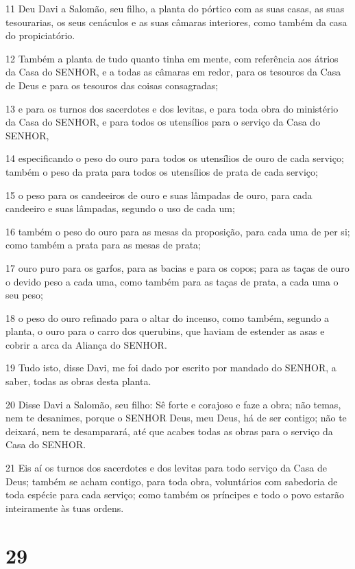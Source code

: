 \par 11 Deu Davi a Salomão, seu filho, a planta do pórtico com as suas casas, as suas tesourarias, os seus cenáculos e as suas câmaras interiores, como também da casa do propiciatório.
\par 12 Também a planta de tudo quanto tinha em mente, com referência aos átrios da Casa do SENHOR, e a todas as câmaras em redor, para os tesouros da Casa de Deus e para os tesouros das coisas consagradas;
\par 13 e para os turnos dos sacerdotes e dos levitas, e para toda obra do ministério da Casa do SENHOR, e para todos os utensílios para o serviço da Casa do SENHOR,
\par 14 especificando o peso do ouro para todos os utensílios de ouro de cada serviço; também o peso da prata para todos os utensílios de prata de cada serviço;
\par 15 o peso para os candeeiros de ouro e suas lâmpadas de ouro, para cada candeeiro e suas lâmpadas, segundo o uso de cada um;
\par 16 também o peso do ouro para as mesas da proposição, para cada uma de per si; como também a prata para as mesas de prata;
\par 17 ouro puro para os garfos, para as bacias e para os copos; para as taças de ouro o devido peso a cada uma, como também para as taças de prata, a cada uma o seu peso;
\par 18 o peso do ouro refinado para o altar do incenso, como também, segundo a planta, o ouro para o carro dos querubins, que haviam de estender as asas e cobrir a arca da Aliança do SENHOR.
\par 19 Tudo isto, disse Davi, me foi dado por escrito por mandado do SENHOR, a saber, todas as obras desta planta.
\par 20 Disse Davi a Salomão, seu filho: Sê forte e corajoso e faze a obra; não temas, nem te desanimes, porque o SENHOR Deus, meu Deus, há de ser contigo; não te deixará, nem te desamparará, até que acabes todas as obras para o serviço da Casa do SENHOR.
\par 21 Eis aí os turnos dos sacerdotes e dos levitas para todo serviço da Casa de Deus; também se acham contigo, para toda obra, voluntários com sabedoria de toda espécie para cada serviço; como também os príncipes e todo o povo estarão inteiramente às tuas ordens.

\chapter{29}

